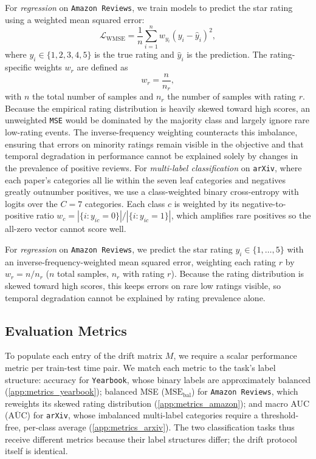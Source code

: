 For \emph{regression} on \texttt{Amazon Reviews}, we train models to predict the star rating using a weighted mean squared error:
\begin{equation}
    \mathcal{L}_{\text{WMSE}} = \frac{1}{n}\sum_{i=1}^{n} w_{y_i} (y_i - \hat{y}_i)^2,
\end{equation}
where $y_i \in \{1,2,3,4,5\}$ is the true rating and $\hat{y}_i$ is the prediction. The rating-specific weights $w_r$ are defined as
\begin{equation}
    w_r = \frac{n}{n_r},
\end{equation}
with $n$ the total number of samples and $n_r$ the number of samples with rating $r$. Because the empirical rating distribution is heavily skewed toward high scores, an unweighted \texttt{MSE} would be dominated by the majority class and largely ignore rare low-rating events. The inverse-frequency weighting counteracts this imbalance, ensuring that errors on minority ratings remain visible in the objective and that temporal degradation in performance cannot be explained solely by changes in the prevalence of positive reviews.
\else
For \emph{multi-label classification} on \texttt{arXiv}, where each paper's categories all lie within the seven leaf categories and negatives greatly outnumber positives, we use a class-weighted binary cross-entropy with logits over the $C = 7$ categories. Each class $c$ is weighted by its negative-to-positive ratio $w_c = |\{i : y_{ic} = 0\}| / |\{i : y_{ic} = 1\}|$, which amplifies rare positives so the all-zero vector cannot score well.

For \emph{regression} on \texttt{Amazon Reviews}, we predict the star rating $y_i \in \{1,\dots,5\}$ with an inverse-frequency-weighted mean squared error, weighting each rating $r$ by $w_r = n/n_r$ ($n$ total samples, $n_r$ with rating $r$). Because the rating distribution is skewed toward high scores, this keeps errors on rare low ratings visible, so temporal degradation cannot be explained by rating prevalence alone.
\fi

\subsection{Evaluation Metrics}

To populate each entry of the drift matrix $M$, we require a scalar performance metric per train-test time pair. We match each metric to the task's label structure: accuracy for \texttt{Yearbook}, whose binary labels are approximately balanced (\cref{app:metrics_yearbook}); balanced MSE ($\text{MSE}_{\text{bal}}$) for \texttt{Amazon Reviews}, which reweights its skewed rating distribution (\cref{app:metrics_amazon}); and macro AUC ($\overline{\text{AUC}}$) for \texttt{arXiv}, whose imbalanced multi-label categories require a threshold-free, per-class average (\cref{app:metrics_arxiv}). The two classification tasks thus receive different metrics because their label structures differ; the drift protocol itself is identical.

